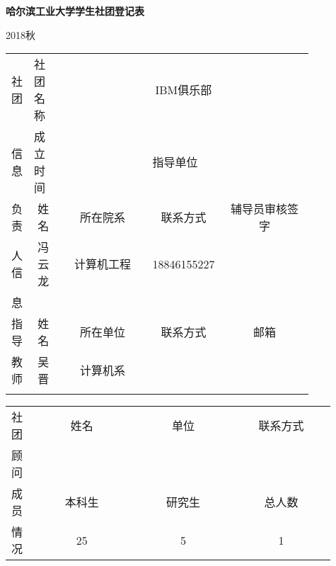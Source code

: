 \documentclass{BaseSetting}
\def\clubname{IBM俱乐部}
\newcommand{\cent}[1]{\multicolumn{1}{c|}{#1}}
\begin{document}
\begin{center}
	\Large \textbf{哈尔滨工业大学学生社团登记表}
\end{center}

\begin{flushright}
	2018秋
\end{flushright}

\begin{table}[H]
	\begin{tabular}{|p{0.05\linewidth}|p{0.1\linewidth}|p{0.3\linewidth}|p{0.1\linewidth}|p{0.3\linewidth}|}
		\hline
		社团 & 社团名称      & \multicolumn{3}{c|}{\clubname}                                              \\ \cline{2-5}
		信息 & 成立时间      &                                & 指导单位           &                       \\ \hline
		负责 & \cent{姓名}   & \cent{所在院系}                & \cent{联系方式}    & \cent{辅导员审核签字} \\ \cline{2-5}
		人信 & \cent{冯云龙} & \cent{计算机工程}              & \cent{18846155227} &                       \\ \cline{2-5}
		息   &               &                                &                    &                       \\ \hline
		指导 & \cent{姓名}   & \cent{所在单位}                & \cent{联系方式}    & \cent{邮箱}           \\ \cline{2-5}
		教师 & \cent{吴晋}   & \cent{计算机系}                &                    &                       \\ \cline{2-5}
		     &               &                                &                    &                       \\ \hline
	\end{tabular}

	\begin{tabular}{|p{0.05\linewidth}|p{0.3\linewidth}|p{0.28\linewidth}|p{0.28\linewidth}|}
		社团 & \cent{姓名}                                                                                    & \cent{单位}   & \cent{联系方式} \\ \cline{2-4}
		顾问 &                                                                                                &               &                 \\ \hline

		成员 & \cent{本科生}                                                                                  & \cent{研究生} & \cent{总人数}   \\ \cline{2-4}
		情况 & \cent{25}                                                                                      & \cent{5}      & \cent{1}        \\ \hline


\end{tabular}
\end{table}
\end{document}
